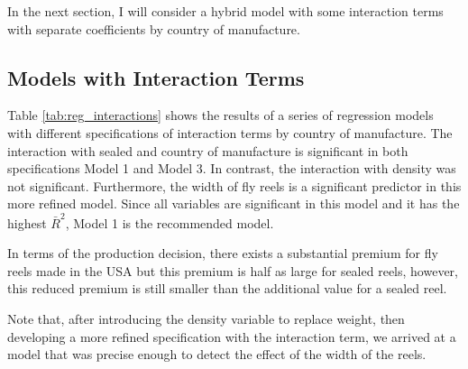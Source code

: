 \documentclass[11pt]{paper}
\begin{document}
In the next section, 
I will consider a hybrid model with some interaction terms
with separate coefficients by country of manufacture. 


\pagebreak
\subsection{Models with Interaction Terms}

Table \ref{tab:reg_interactions} shows the results of 
a series of regression models with different 
specifications of interaction terms by country of manufacture. 
% 
The interaction with sealed and country of manufacture is significant in both specifications Model 1 and Model 3.
In contrast, the interaction with density was not significant. 
Furthermore, the width of fly reels is a significant predictor
in this more refined model. 
Since all variables are significant in this model and it
has the highest $\bar{R}^2$, Model 1 is the recommended model.





In terms of the production decision, 
there exists a substantial premium for fly reels made in the USA
but this premium is half as large for sealed reels, 
however, this reduced premium is still smaller than the 
additional value for a sealed reel.  

Note that, after introducing the density variable to replace weight, 
then developing a more refined specification with the interaction term, 
we arrived at a model that was precise enough to detect 
the effect of the width of the reels.


\end{document}
